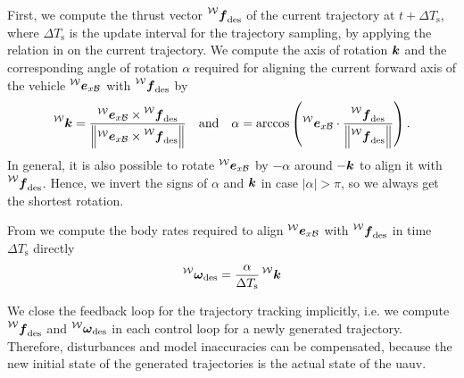 First, we compute the thrust vector $\thrustdesiredworld$ of the current trajectory at $t+\Delta T_\text{s}$, where $\Delta T_{\text{s}}$ is the update interval for the trajectory sampling, by applying the relation in  on the current trajectory.
We compute the axis of rotation $\mbox{$\bm{k}$}$ and the corresponding angle of rotation $\alpha$ required for aligning the current forward axis of the vehicle $\prescript{\mathcal{W}}{}{\mbox{$\bm{e}$}}_{x\mathcal{B}}$ with $\thrustdesiredworld$ by
\begin{equation}
	\label{eq:rotation-to-desired-thrust-vector}
	\rotationaxisworld = \frac{
		\exbodyinworld \times \thrustdesiredworld
	}{
		\left\lVert
			\exbodyinworld \times \thrustdesiredworld
		\right\rVert}
	\quad
	\text{and}
	\quad
	\alpha = \arccos\left(
		\exbodyinworld \cdot
		\frac{\thrustdesiredworld}{\left\lVert\thrustdesiredworld\right\rVert}
	\right)
	.
\end{equation}
In general, it is also possible to rotate $\prescript{\mathcal{W}}{}{\mbox{$\bm{e}$}}_{x\mathcal{B}}$ by $-\alpha$ around $-\mbox{$\bm{k}$}$ to align it with $\thrustdesiredworld$. Hence, we invert the signs of $\alpha$ and $\mbox{$\bm{k}$}$ in case $\lvert\alpha\rvert > \pi$, so we always get the shortest rotation. 

From  we compute the body rates required to align $\prescript{\mathcal{W}}{}{\mbox{$\bm{e}$}}_{x\mathcal{B}}$ with $\thrustdesiredworld$ in time $\Delta T_{\text{s}}$ directly
\begin{equation}
	\vangdesiredworld = \frac{\alpha}{\Delta T_{\text{s}}} \rotationaxisworld
\end{equation}

We close the feedback loop for the trajectory tracking implicitly, i.e. we compute $\thrustdesiredworld$ and $\vangdesiredworld$ in each control loop for a newly generated trajectory.
Therefore, disturbances and model inaccuracies can be compensated, because the new initial state of the generated trajectories is the actual state of the \ac{uauv}.


